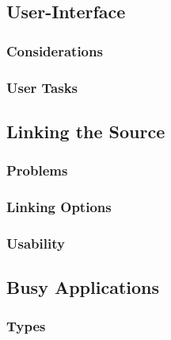 \subsection{User-Interface}
	\subsubsection{Considerations}
	\subsubsection{User Tasks}
	\subsubsection{}
	
\subsection{Linking the Source}
	\subsubsection{Problems}
	
	\subsubsection{Linking Options}
	
	\subsubsection{Usability} 
	
\subsection{Busy Applications}
	\subsubsection{Types}
	
